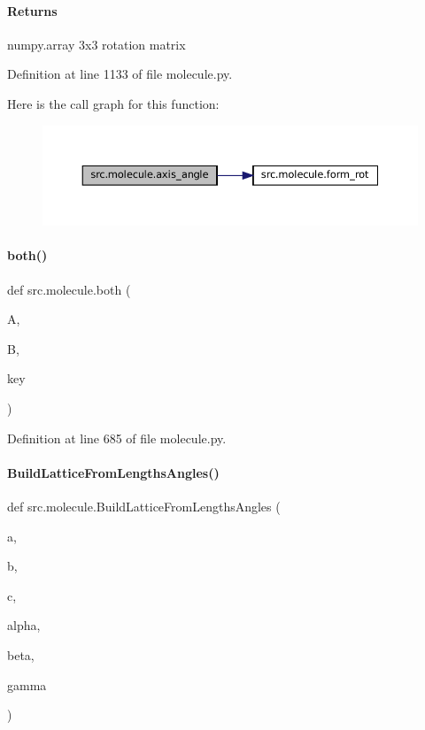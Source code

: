 \paragraph*{Returns }

numpy.\+array 3x3 rotation matrix 

Definition at line 1133 of file molecule.\+py.

Here is the call graph for this function\+:
\nopagebreak
\begin{figure}[H]
\begin{center}
\leavevmode
\includegraphics[width=350pt]{namespacesrc_1_1molecule_a18b08895867e37ef3cb86a3d4456c775_cgraph}
\end{center}
\end{figure}
\mbox{\label{namespacesrc_1_1molecule_a406a751e54f7e50da529c5d45f7f7de8}} 
\paragraph{\texorpdfstring{both()}{both()}}
{\footnotesize\ttfamily def src.\+molecule.\+both (\begin{DoxyParamCaption}\item[{}]{A,  }\item[{}]{B,  }\item[{}]{key }\end{DoxyParamCaption})}



Definition at line 685 of file molecule.\+py.

\mbox{\label{namespacesrc_1_1molecule_a037d06bd9038517f2784bce4e0ad6d86}} 
\paragraph{\texorpdfstring{Build\+Lattice\+From\+Lengths\+Angles()}{BuildLatticeFromLengthsAngles()}}
{\footnotesize\ttfamily def src.\+molecule.\+Build\+Lattice\+From\+Lengths\+Angles (\begin{DoxyParamCaption}\item[{}]{a,  }\item[{}]{b,  }\item[{}]{c,  }\item[{}]{alpha,  }\item[{}]{beta,  }\item[{}]{gamma }\end{DoxyParamCaption})}



